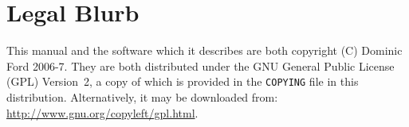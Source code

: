 \section{Legal Blurb}

This manual and the software which it describes are both copyright (C)
Dominic Ford 2006-7. They are both distributed under the GNU General Public
License (GPL) Version~2, a copy of which is provided in the \texttt{COPYING}
file in this distribution. Alternatively, it may
be downloaded from:\\ \url{http://www.gnu.org/copyleft/gpl.html}.

